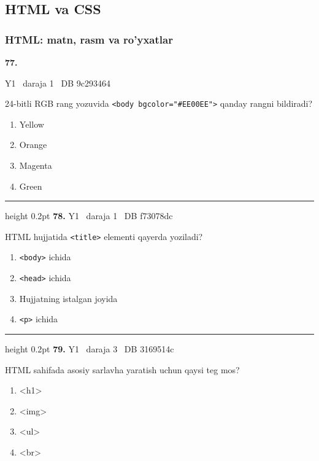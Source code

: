 \documentclass[10pt,a4paper,oneside]{article}
\begin{document}
\subsection{HTML va CSS}
\subsubsection{HTML: matn, rasm va ro'yxatlar}
\hypertarget{q77}{\textbf{\color{ink}77.}}  {\color{muted}\scriptsize Y1 \textbullet\ daraja 1 \textbullet\ DB 9c293464}
\par
24-bitli RGB rang yozuvida \texttt{\textless{}body bgcolor="\#EE00EE"\textgreater{}} qanday rangni bildiradi?
\begin{enumerate}[label=\Alph*),leftmargin=9mm]
\item Yellow
\item Orange
\item Magenta
\item Green
\end{enumerate}
\vspace{2mm}\hrule height 0.2pt \vspace{4mm}
\hypertarget{q78}{\textbf{\color{ink}78.}}  {\color{muted}\scriptsize Y1 \textbullet\ daraja 1 \textbullet\ DB f73078dc}
\par
HTML hujjatida \texttt{\textless{}title\textgreater{}} elementi qayerda yoziladi?
\begin{enumerate}[label=\Alph*),leftmargin=9mm]
\item \texttt{\textless{}body\textgreater{}} ichida
\item \texttt{\textless{}head\textgreater{}} ichida
\item Hujjatning istalgan joyida
\item \texttt{\textless{}p\textgreater{}} ichida
\end{enumerate}
\vspace{2mm}\hrule height 0.2pt \vspace{4mm}
\hypertarget{q79}{\textbf{\color{ink}79.}}  {\color{muted}\scriptsize Y1 \textbullet\ daraja 3 \textbullet\ DB 3169514c}
\par
HTML sahifada asosiy sarlavha yaratish uchun qaysi teg mos?
\begin{enumerate}[label=\Alph*),leftmargin=9mm]
\item \textless{}h1\textgreater{}
\item \textless{}img\textgreater{}
\item \textless{}ul\textgreater{}
\item \textless{}br\textgreater{}
\end{enumerate}
\end{document}
